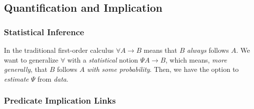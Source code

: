 \documentclass[11pt]{article}
\begin{document}
\subsection{Quantification and Implication}
\subsubsection{Statistical Inference}
In the traditional first-order calculus $\forall A\rightarrow B$ means that $B$ {\em always} follows $A$.
We want to generalize $\forall$ with a {\em statistical} notion $\Psi A\rightarrow B$, which means, {\em more generally}, that $B$ follows $A$ {\em with some probability}.
Then, we have the option to {\em estimate} $\Psi$ from {\em data}.
\subsubsection{Predicate Implication Links}
\end{document}
